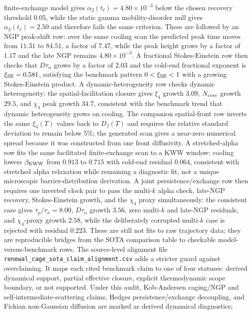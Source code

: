 \documentclass[aps,preprint,onecolumn,superscriptaddress,nofootinbib]{revtex4-2}
\begin{document}
finite-exchange model gives $\alpha_2(t_\ell)=4.80\times10^{-3}$ below the
chosen recovery threshold $0.05$, while the static gamma mobility-disorder null
gives $\alpha_2(t_\ell)=2.50$ and therefore fails the same criterion. These are
followed by an NGP peak-shift row: over the same cooling scan the predicted
peak time moves from $11.31$ to $84.51$, a factor of $7.47$, while the peak
height grows by a factor of $1.17$ and the late NGP remains
$4.80\times10^{-3}$. A fractional Stokes-Einstein row then checks that
$D\tau_\alpha$ grows by a factor of $2.03$ and the cold-end fractional exponent
is $\xi_{\rm SE}=0.581$, satisfying the benchmark pattern
$0<\xi_{\rm SE}<1$ with a growing Stokes-Einstein product. A
dynamic-heterogeneity row checks dynamic heterogeneity: the
spatial-facilitation closure gives
$\xi_4$ growth $3.09$, $N_{\rm corr}$ growth $29.5$, and $\chi_4$ peak growth
$34.7$, consistent with the benchmark trend that dynamic heterogeneity grows on
cooling. The companion spatial-front row inverts the same $\xi_4(T)$ values
back to $D_f(T)$ and requires the relative standard deviation to remain below
$5\%$; the generated scan gives a near-zero numerical spread because it was
constructed from one front diffusivity. A stretched-alpha row fits the same
facilitated finite-exchange scan to a KWW window: cooling lowers
$\beta_{\rm KWW}$ from $0.913$ to $0.715$ with cold-end residual $0.064$,
consistent with stretched alpha relaxation while remaining a diagnostic fit,
not a unique microscopic barrier-distribution derivation. A joint
persistence/exchange row then requires one inverted clock pair to pass the
multi-$k$ alpha check, late-NGP recovery, Stokes-Einstein growth, and the
$\chi_4$ proxy simultaneously: the consistent case gives
$\tau_p/\tau_x=8.00$, $D\tau_\alpha$ growth $3.56$, zero multi-$k$ and
late-NGP residuals, and $\chi_4$-proxy growth $2.58$, while the deliberately
corrupted multi-$k$ case is rejected with residual $0.223$. These are still
not fits to raw trajectory data; they are
reproducible bridges from the SOTA comparison table to checkable
model-versus-benchmark rows.
The source-level alignment file
\texttt{renewal\_cage\_sota\_claim\_alignment.csv} adds a stricter guard against
overclaiming. It maps each cited benchmark claim to one of four statuses:
derived dynamical support, partial effective closure, explicit thermodynamic
scope boundary, or not supported. Under this audit, Kob-Andersen caging/NGP and
self-intermediate-scattering claims, Hedges persistence/exchange decoupling,
and Fickian non-Gaussian diffusion are marked as derived dynamical diagnostics;
\end{document}
